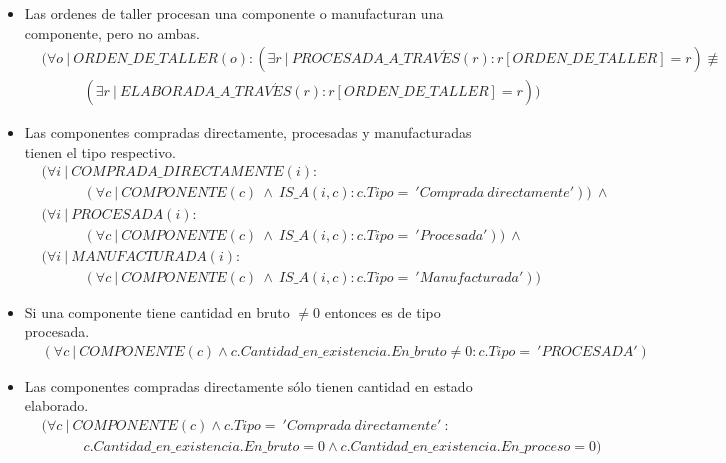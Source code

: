 \documentclass[]{report}
\begin{document}
\begin{itemize}
		\item Las ordenes de taller procesan una componente o manufacturan una componente, pero no ambas.
		\begin{align*}
		&(\forall o\ |\ ORDEN\_DE\_TALLER(o) : (\exists r\ |\ PROCESADA\_A\_TRAV\acute{E}S(r) : r[ORDEN\_DE\_TALLER]=r) \not \equiv \\
		& \hspace{3em} (\exists r\ |\ ELABORADA\_A\_TRAV\acute{E}S(r) : r[ORDEN\_DE\_TALLER]=r))
		\end{align*}
		
		\item Las componentes compradas directamente, procesadas y manufacturadas tienen el tipo respectivo.
		\begin{align*}
			 &(\forall i\ |\ COMPRADA\_DIRECTAMENTE(i) :\\
			 &\hspace{3em} (\forall c\ |\ COMPONENTE(c)\ \land\ IS\_A(i,c) : c.Tipo =\ 'Comprada\ directamente'))\ \land \\
			&(\forall i\ |\ PROCESADA(i) :\\
			&\hspace{3em}(\forall c\ |\ COMPONENTE(c)\ \land\ IS\_A(i,c) : c.Tipo =\ 'Procesada'))\ \land \\
			&(\forall i\ |\ MANUFACTURADA(i) :\\
			&\hspace{3em}(\forall c\ |\ COMPONENTE(c)\ \land\ IS\_A(i,c) : c.Tipo =\ 'Manufacturada'))
		\end{align*}
		
		\item Si una componente tiene cantidad en bruto $\not = 0$ entonces es de tipo procesada.
		\begin{align*}
		&(\forall c\ |\ COMPONENTE(c) \land c.Cantidad\_en\_existencia.En\_bruto \not = 0 : c.Tipo =\ 'PROCESADA')
		\end{align*}
		
		\item Las componentes compradas directamente sólo tienen cantidad en estado elaborado.
		\begin{align*}
		&(\forall c\ |\ COMPONENTE(c) \land c.Tipo =\ 'Comprada\ directamente'\ : \\
		& \hspace{3em}c.Cantidad\_en\_existencia.En\_bruto = 0 \land c.Cantidad\_en\_existencia.En\_proceso = 0)
		\end{align*}
		

\end{itemize}
\end{document}
